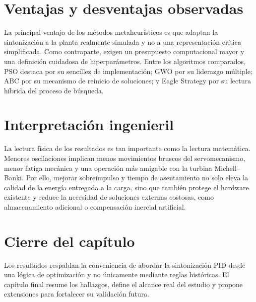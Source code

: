 \section{Ventajas y desventajas observadas}
La principal ventaja de los métodos metaheurísticos es que adaptan la sintonización a la planta
realmente simulada y no a una representación crítica simplificada. Como contraparte, exigen un
presupuesto computacional mayor y una definición cuidadosa de hiperparámetros. Entre los
algoritmos comparados, PSO destaca por su sencillez de implementación; GWO por su liderazgo
múltiple; ABC por su mecanismo de reinicio de soluciones; y Eagle Strategy por su lectura
híbrida del proceso de búsqueda.

\section{Interpretación ingenieril}
La lectura física de los resultados es tan importante como la lectura matemática. Menores
oscilaciones implican menos movimientos bruscos del servomecanismo, menor fatiga mecánica
y una operación más amigable con la turbina Michell--Banki. Por ello, mejorar sobreimpulso y
tiempo de asentamiento no solo eleva la calidad de la energía entregada a la carga, sino que
también protege el hardware existente y reduce la necesidad de soluciones externas costosas,
como almacenamiento adicional o compensación inercial artificial.

\section{Cierre del capítulo}
Los resultados respaldan la conveniencia de abordar la sintonización PID desde una lógica de
optimización y no únicamente mediante reglas históricas. El capítulo final resume los hallazgos,
define el alcance real del estudio y propone extensiones para fortalecer su validación futura.
